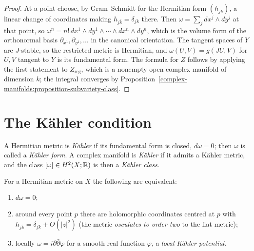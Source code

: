 \begin{proof}
At a point choose, by Gram--Schmidt for the Hermitian form $(h_{j\bar k})$, a linear change of coordinates making $h_{j\bar k} = \delta_{jk}$
there. Then $\omega = \sum_jdx^j \wedge dy^j$ at that point, so
$\omega^n = n!\,dx^1 \wedge dy^1 \wedge \cdots \wedge dx^n \wedge dy^n$, which is the volume form of the orthonormal basis
$\partial_{x^1}, \partial_{y^1}, \ldots$ in the canonical orientation. The tangent spaces of $Y$ are $J$-stable, so the restricted metric is
Hermitian, and $\omega(U, V) = g(JU, V)$ for $U, V$ tangent to $Y$ is its fundamental form. The formula for $Z$ follows by applying the
first statement to $Z_{\mathrm{reg}}$, which is a nonempty open complex manifold of dimension $k$; the integral converges by
Proposition~\ref{complex-manifolds:proposition-subvariety-class}.
\end{proof}

\section{The K\"ahler condition}\label{kahler:section-kahler}

\begin{definition}\label{kahler:definition-kahler}
A Hermitian metric is \emph{K\"ahler} if its fundamental form is closed, $d\omega = 0$; then $\omega$ is called a \emph{K\"ahler form}. A
complex manifold is \emph{K\"ahler} if it admits a K\"ahler metric, and the class $[\omega] \in H^2(X; \mathbb{R})$ is then a
\emph{K\"ahler class}.
\end{definition}

\begin{proposition}\label{kahler:proposition-kahler-equivalent}
For a Hermitian metric on $X$ the following are equivalent:
\begin{enumerate}
\item $d\omega = 0$;
\item around every point $p$ there are holomorphic coordinates centred at $p$ with $h_{j\bar k} = \delta_{jk} + O(|z|^2)$ (the metric
\emph{osculates to order two} to the flat metric);
\item locally $\omega = i\partial\bar\partial\varphi$ for a smooth real function $\varphi$, a \emph{local K\"ahler potential}.
\end{enumerate}
\end{proposition}

